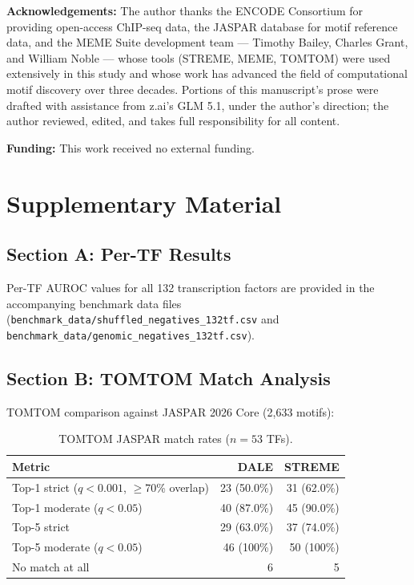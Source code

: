 \documentclass[11pt,a4paper]{article}
\begin{document}
\vspace{1em}
\noindent\textbf{Acknowledgements:} The author thanks the ENCODE Consortium for providing open-access ChIP-seq data, the JASPAR database for motif reference data, and the MEME Suite development team --- Timothy Bailey, Charles Grant, and William Noble --- whose tools (STREME, MEME, TOMTOM) were used extensively in this study and whose work has advanced the field of computational motif discovery over three decades. Portions of this manuscript's prose were drafted with assistance from z.ai's GLM 5.1, under the author's direction; the author reviewed, edited, and takes full responsibility for all content.

\vspace{1em}
\noindent\textbf{Funding:} This work received no external funding.




\clearpage
\appendix
\renewcommand{\thesection}{\Alph{section}}
\section*{Supplementary Material}

\subsection*{Section A: Per-TF Results}

Per-TF AUROC values for all 132 transcription factors are provided in the accompanying benchmark data files (\texttt{benchmark\_data/shuffled\_negatives\_132tf.csv} and \texttt{benchmark\_data/genomic\_negatives\_132tf.csv}).

\subsection*{Section B: TOMTOM Match Analysis}

TOMTOM comparison against JASPAR 2026 Core (2{,}633 motifs):

\begin{table}[H]
\centering
\caption{TOMTOM JASPAR match rates ($n = 53$ TFs).}
\label{tab:supp_tomtom}
\small
\begin{tabular}{lrr}
\toprule
Metric & DALE & STREME \\
\midrule
Top-1 strict ($q<0.001$, $\geq$70\% overlap) & 23 (50.0\%) & 31 (62.0\%) \\
Top-1 moderate ($q<0.05$) & 40 (87.0\%) & 45 (90.0\%) \\
Top-5 strict & 29 (63.0\%) & 37 (74.0\%) \\
Top-5 moderate ($q<0.05$) & 46 (100\%) & 50 (100\%) \\
No match at all & 6 & 5 \\
\bottomrule
\end{tabular}
\end{table}
\end{document}
